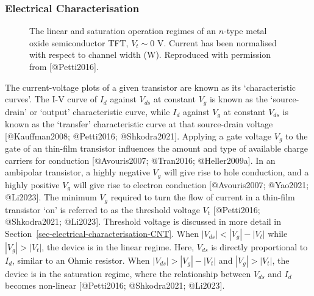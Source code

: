 \documentclass[
  letterpaper,
  DIV=11,
  numbers=noendperiod]{scrartcl}
\begin{document}
\subsubsection{Electrical
Characterisation}\label{electrical-characterisation}

\begin{figure}


\caption{\label{fig-linear-region}The linear and saturation operation
regimes of an \(n\)-type metal oxide semiconductor TFT, \(V_{t} \sim 0\)
V. Current has been normalised with respect to channel width (W).
Reproduced with permission from {[}@Petti2016{]}.}

\end{figure}%

The current-voltage plots of a given transistor are known as its
`characteristic curves'. The I-V curve of \(I_d\) against \(V_{ds}\) at
constant \(V_g\) is known as the `source-drain' or `output'
characteristic curve, while \(I_d\) against \(V_g\) at constant
\(V_{ds}\) is known as the `transfer' characteristic curve at that
source-drain voltage {[}@Kauffman2008; @Petti2016; @Shkodra2021{]}.
Applying a gate voltage \(V_g\) to the gate of an thin-film transistor
influences the amount and type of available charge carriers for
conduction {[}@Avouris2007; @Tran2016; @Heller2009a{]}. In an ambipolar
transistor, a highly negative \(V_g\) will give rise to hole conduction,
and a highly positive \(V_g\) will give rise to electron conduction
{[}@Avouris2007; @Yao2021; @Li2023{]}. The minimum \(V_g\) required to
turn the flow of current in a thin-film transistor `on' is referred to
as the threshold voltage \(V_t\) {[}@Petti2016; @Shkodra2021;
@Li2023{]}. Threshold voltage is discussed in more detail in
Section~\ref{sec-electrical-characterisation-CNT}. When
\(|V_{ds}| < |V_g| - |V_t|\) while \(|V_g|>|V_t|\), the device is in the
linear regime. Here, \(V_{ds}\) is directly proportional to \(I_{d}\),
similar to an Ohmic resistor. When \(|V_{ds}| > |V_g| - |V_t|\) and
\(|V_g|>|V_t|\), the device is in the saturation regime, where the
relationship between \(V_{ds}\) and \(I_{d}\) becomes non-linear
{[}@Petti2016; @Shkodra2021; @Li2023{]}.
\end{document}
